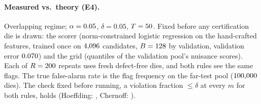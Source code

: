 \paragraph{Measured vs.\ theory (E4).} Overlapping regime; $\alpha=0.05$, $\delta=0.05$,
$T=50$. Fixed before any certification die is drawn: the scorer (norm-constrained logistic
regression on the hand-crafted features, trained once on $4{,}096$ candidates, $B=128$
by validation, validation error $0.070$) and the grid (quantiles of the validation
pool's nuisance scores). Each of $R=200$ repeats uses fresh defect-free dies, and both
rules see the same flags. The true false-alarm rate is the flag frequency on the far-test pool
($100{,}000$ dies). The check fixed before running, a violation fraction $\le\delta$ at every $m$
for both rules, holds (Hoeffding: \EFourPass, Chernoff: \EFourChPass).

